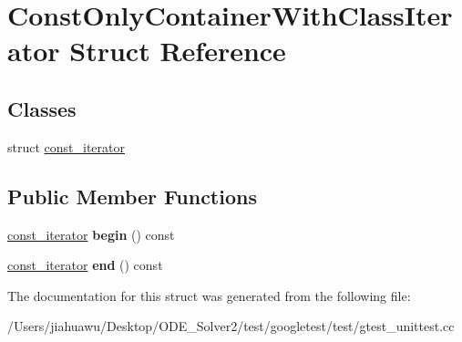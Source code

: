 \hypertarget{struct_const_only_container_with_class_iterator}{}\section{Const\+Only\+Container\+With\+Class\+Iterator Struct Reference}
\label{struct_const_only_container_with_class_iterator}
\subsection*{Classes}
\begin{DoxyCompactItemize}
\item 
struct \mbox{\hyperlink{struct_const_only_container_with_class_iterator_1_1const__iterator}{const\+\_\+iterator}}
\end{DoxyCompactItemize}
\subsection*{Public Member Functions}
\begin{DoxyCompactItemize}
\item 
\mbox{\label{struct_const_only_container_with_class_iterator_a30be5262acd17c34d19b19d560ebd541}} 
\mbox{\hyperlink{struct_const_only_container_with_class_iterator_1_1const__iterator}{const\+\_\+iterator}} {\bfseries begin} () const
\item 
\mbox{\label{struct_const_only_container_with_class_iterator_a3d6e17f17eecd7b1ef02afc9a75a0bde}} 
\mbox{\hyperlink{struct_const_only_container_with_class_iterator_1_1const__iterator}{const\+\_\+iterator}} {\bfseries end} () const
\end{DoxyCompactItemize}


The documentation for this struct was generated from the following file\+:\begin{DoxyCompactItemize}
\item 
/\+Users/jiahuawu/\+Desktop/\+O\+D\+E\+\_\+\+Solver2/test/googletest/test/gtest\+\_\+unittest.\+cc\end{DoxyCompactItemize}
